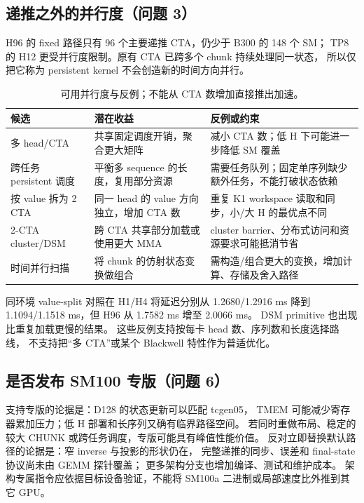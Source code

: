 \documentclass[11pt,a4paper,fontset=none]{ctexart}
\begin{document}
\subsection{递推之外的并行度（问题 3）}
H96 的 fixed 路径只有 96 个主要递推 CTA，仍少于 B300 的 148 个 SM；
TP8 的 H12 更受并行度限制。原有 CTA 已跨多个 chunk 持续处理同一状态，
所以仅把它称为 persistent kernel 不会创造新的时间方向并行。

\begin{table}[htbp]\centering\small
\begin{tabularx}{\linewidth}{@{}p{25mm}YY@{}}\toprule
候选&潜在收益&反例或约束\\\midrule
多 head/CTA&共享固定调度开销，聚合更大矩阵&减小 CTA 数；低 H 下可能进一步降低 SM 覆盖\\
跨任务 persistent 调度&平衡多 sequence 的长度，复用部分资源&需要任务队列；固定单序列缺少额外任务，不能打破状态依赖\\
按 value 拆为 2 CTA&同一 head 的 value 方向独立，增加 CTA 数&重复 K1 workspace 读取和同步，小/大 H 的最优点不同\\
2-CTA cluster/DSM&跨 CTA 共享部分加载或使用更大 MMA&cluster barrier、分布式访问和资源要求可能抵消节省\\
时间并行扫描&将 chunk 的仿射状态变换做组合&需构造/组合更大的变换，增加计算、存储及舍入路径\\\bottomrule
\end{tabularx}
\caption{可用并行度与反例；不能从 CTA 数增加直接推出加速。}
\end{table}

同环境 value-split 对照在 H1/H4 将延迟分别从 1.2680/1.2916 ms 降到
1.1094/1.1518 ms，但 H96 从 1.7582 ms 增至 2.0066 ms。
DSM primitive 也出现比重复加载更慢的结果。
这些反例支持按每卡 head 数、序列数和长度选择路线，
不支持把“多 CTA”或某个 Blackwell 特性作为普适优化。

\subsection{是否发布 SM100 专版（问题 6）}
支持专版的论据是：D128 的状态更新可以匹配 tcgen05，
TMEM 可能减少寄存器累加压力；低 H 部署和长序列又确有临界路径空间。
若同时重做布局、稳定的较大 CHUNK 或跨任务调度，专版可能具有峰值性能价值。
反对立即替换默认路径的论据是：窄 inverse 与投影的形状仍在，
完整递推的同步、误差和 final-state 协议尚未由 GEMM 探针覆盖；
更多架构分支也增加编译、测试和维护成本。
架构专属指令应依据目标设备验证，不能将 SM100a 二进制或局部速度比外推到其它 GPU\cite{blackwell}。
\end{document}
